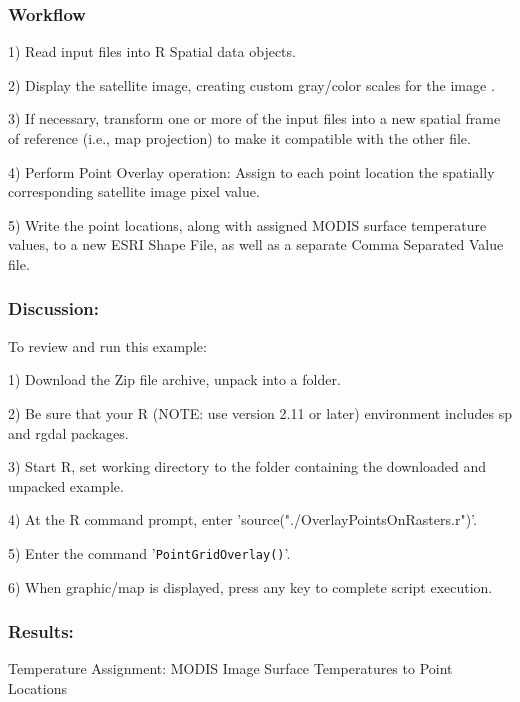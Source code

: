 \documentclass{beamer}
\begin{document}
\begin{frame}[fragile]
\frametitle{Workflow}
1) Read input files into R Spatial data objects.

2) Display the satellite image, creating custom gray/color scales for the image .

3) If necessary, transform one or more of the input files into a new spatial frame of reference (i.e., map projection) to make it compatible with the other file.

4) Perform Point Overlay operation: Assign to each point location the spatially corresponding satellite image pixel value.

5) Write the point locations, along with assigned MODIS surface temperature values, to a new ESRI Shape File, as well as a separate Comma Separated Value file.
\end{frame}
\begin{frame}[fragile]
\frametitle{Discussion:}
To review and run this example:

1) Download the Zip file archive, unpack into a folder.

2) Be sure that your R (NOTE: use version 2.11 or later) environment includes sp and rgdal packages.

3) Start R, set working directory to the folder containing the downloaded and unpacked example.

4) At the R command prompt, enter 'source("./OverlayPointsOnRasters.r")'.

5) Enter the command '\texttt{PointGridOverlay()}'.

6) When graphic/map is displayed, press any key to complete script execution.
\end{frame}
\begin{frame}[fragile]
\frametitle{Results:}

Temperature Assignment: MODIS Image Surface Temperatures to Point Locations
\end{frame}
 
\end{document}
